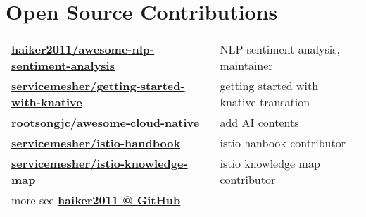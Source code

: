 \documentclass[]{deedy-resume-openfont}
\begin{document}
\begin{minipage}[t]{0.73\textwidth}




\section{Open Source Contributions}
\begin{tabular}{ll}
\href{https://github.com/haiker2011/awesome-nlp-sentiment-analysis/commits?author=haiker2011}{\bf haiker2011/awesome-nlp-sentiment-analysis} & NLP sentiment analysis, maintainer \\
\href{https://github.com/servicemesher/getting-started-with-knative/commits?author=haiker2011}{\bf servicemesher/getting-started-with-knative} & getting started with knative transation \\
\href{https://github.com/rootsongjc/awesome-cloud-native/commits?author=haiker2011}{\bf rootsongjc/awesome-cloud-native} & add AI contents \\
\href{https://github.com/servicemesher/istio-handbook/commits?author=haiker2011}{\bf servicemesher/istio-handbook} & istio hanbook contributor \\
\href{https://github.com/servicemesher/istio-knowledge-map/commits?author=haiker2011}{\bf servicemesher/istio-knowledge-map} & istio knowledge map contributor \\
more see \href{https://github.com/haiker2011}{\bf haiker2011 @ GitHub} & \\
\end{tabular}
\sectionsep


\end{minipage}
\end{document}
